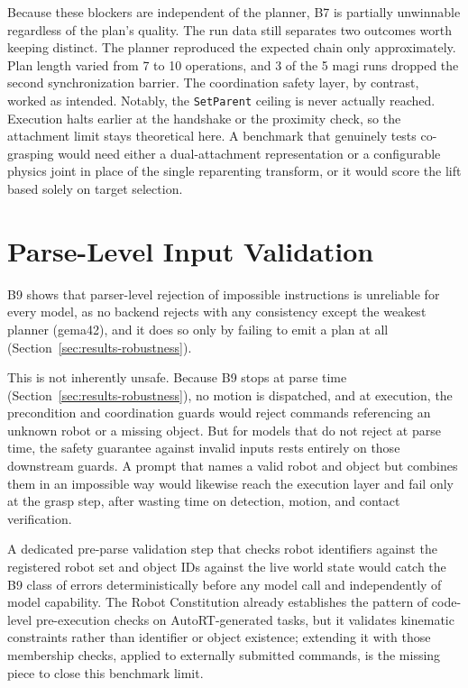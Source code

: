 Because these blockers are independent of the planner, B7 is partially unwinnable regardless of the plan’s quality. The run data still separates two outcomes worth keeping distinct. The planner reproduced the expected chain only approximately. Plan length varied from 7 to 10 operations, and 3 of the 5 \gls{magi} runs dropped the second synchronization barrier. The coordination safety layer, by contrast, worked as intended. Notably, the \texttt{SetParent} ceiling is never actually reached. Execution halts earlier at the handshake or the proximity check, so the attachment limit stays theoretical here. A benchmark that genuinely tests co-grasping would need either a dual-attachment representation or a configurable physics joint in place of the single reparenting transform, or it would score the lift based solely on target selection.

\section{Parse-Level Input Validation}\label{sec:parse-validation}
B9 shows that parser-level rejection of impossible instructions is unreliable for every model, as no backend rejects with any consistency except the weakest planner (\gls{gema42}), and it does so only by failing to emit a plan at all (Section~\ref{sec:results-robustness}).

This is not inherently unsafe. Because B9 stops at parse time (Section~\ref{sec:results-robustness}), no motion is dispatched, and at execution, the precondition and coordination guards would reject commands referencing an unknown robot or a missing object. But for models that do not reject at parse time, the safety guarantee against invalid inputs rests entirely on those downstream guards. A prompt that names a valid robot and object but combines them in an impossible way would likewise reach the execution layer and fail only at the grasp step, after wasting time on detection, motion, and contact verification.

A dedicated pre-parse validation step that checks robot identifiers against the registered robot set and object IDs against the live world state would catch the B9 class of errors deterministically before any model call and independently of model capability. The Robot Constitution already establishes the pattern of code-level pre-execution checks on AutoRT-generated tasks, but it validates kinematic constraints rather than identifier or object existence; extending it with those membership checks, applied to externally submitted commands, is the missing piece to close this benchmark limit.

